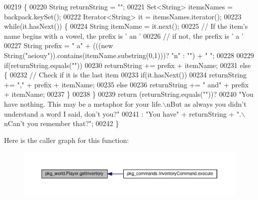 \begin{DoxyCode}
00219                                  \{
00220         String returnString = \textcolor{stringliteral}{""};
00221         Set<String> itemsNames = backpack.keySet();
00222         Iterator<String> it = itemsNames.iterator();
00223         \textcolor{keywordflow}{while}(it.hasNext()) \{
00224             String itemName = it.next();
00225             \textcolor{comment}{// If the item's name begins with a vowel, the prefix is ' an '}
00226             \textcolor{comment}{// if not, the prefix is ' a '}
00227             String prefix = \textcolor{stringliteral}{" a"} + (((\textcolor{keyword}{new} String(\textcolor{stringliteral}{"aeiouy"})).contains(itemName.substring(0,1)))? \textcolor{stringliteral}{"n"} : \textcolor{stringliteral}{""}) +
       \textcolor{stringliteral}{" "};
00228 
00229             \textcolor{keywordflow}{if}(returnString.equals(\textcolor{stringliteral}{""}))
00230                 returnString += prefix + itemName;
00231             \textcolor{keywordflow}{else} \{
00232                 \textcolor{comment}{// Check if it is the last item}
00233                 \textcolor{keywordflow}{if}(it.hasNext())
00234                     returnString += \textcolor{stringliteral}{","} + prefix + itemName;
00235                 \textcolor{keywordflow}{else}
00236                     returnString += \textcolor{stringliteral}{" and"} + prefix + itemName;
00237             \}
00238         \}
00239         \textcolor{keywordflow}{return} (returnString.equals(\textcolor{stringliteral}{""}))?
00240             \textcolor{stringliteral}{"You have nothing. This may be a metaphor for your life.\(\backslash\)nBut as always you didn't understand a
       word I said, don't you?"}
00241             : \textcolor{stringliteral}{"You have"} + returnString + \textcolor{stringliteral}{".\(\backslash\)nCan't you remember that?"};
00242     \}
\end{DoxyCode}


Here is the caller graph for this function\-:\nopagebreak
\begin{figure}[H]
\begin{center}
\leavevmode
\includegraphics[width=350pt]{classpkg__world_1_1Player_a2a6e491f41e159bbac42022e55df2d52_icgraph}
\end{center}
\end{figure}


